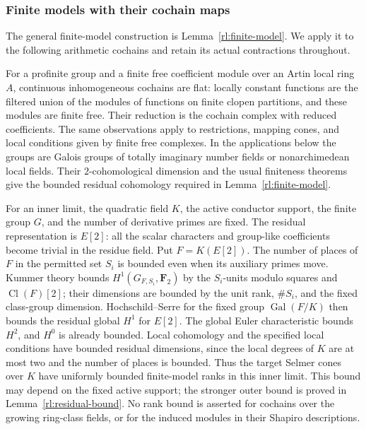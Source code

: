 \subsubsection{Finite models with their cochain maps}

The general finite-model construction is Lemma~\ref{rl:finite-model}.
We apply it to the following arithmetic cochains and retain its actual
contractions throughout.

For a profinite group and a finite free coefficient module over an Artin local ring $A$,
continuous inhomogeneous cochains are flat: locally constant functions are
the filtered union of the modules of functions on finite clopen partitions,
and these modules are finite free.  Their reduction is the cochain complex
with reduced coefficients.  The same observations apply to restrictions,
mapping cones, and local conditions given by finite free complexes.  In the
applications below the groups are Galois groups of totally imaginary number
fields or nonarchimedean local fields.  Their $2$-cohomological dimension and
the usual finiteness theorems give the bounded residual cohomology required
in Lemma~\ref{rl:finite-model}.

For an inner limit, the quadratic field $K$, the active conductor support,
the finite group $G$, and the number of derivative primes are fixed.
The residual representation is $E[2]$: all the scalar characters and
group-like coefficients become trivial in the residue field. Put
$F=K(E[2])$. The number of places of $F$ in the permitted set $S_i$ is
bounded even when its auxiliary primes move. Kummer theory bounds
$H^1(G_{F,S_i},\mathbf F_2)$ by the $S_i$-units modulo squares and
$\operatorname{Cl}(F)[2]$; their dimensions are bounded by the unit
rank, $\#S_i$, and the fixed class-group dimension. Hochschild--Serre
for the fixed group $\operatorname{Gal}(F/K)$ then bounds the residual
global $H^1$ for $E[2]$. The global Euler characteristic bounds $H^2$,
and $H^0$ is already bounded. Local cohomology and the specified local
conditions have bounded residual dimensions, since the local degrees
of $K$ are at most two and the number of places is bounded. Thus the
target Selmer cones over $K$ have uniformly bounded finite-model ranks
in this inner limit. This bound may depend on the fixed active support;
the stronger outer bound is proved in Lemma~\ref{rl:residual-bound}.
No rank bound is asserted for cochains over the growing ring-class
fields, or for the induced modules in their Shapiro descriptions.

